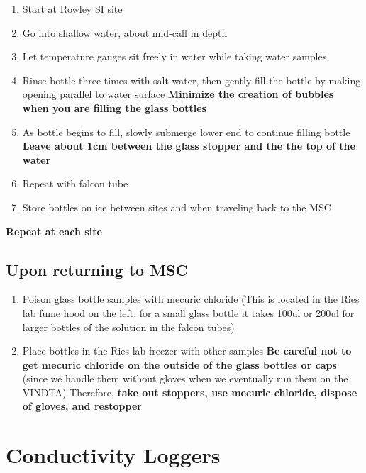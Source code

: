 \documentclass[
  letterpaper,
  DIV=11,
  numbers=noendperiod]{scrreprt}
\begin{document}
\begin{enumerate}
\def\labelenumi{\arabic{enumi}.}
\item
  Start at Rowley SI site
\item
  Go into shallow water, about mid-calf in depth
\item
  Let temperature gauges sit freely in water while taking water samples
\item
  Rinse bottle three times with salt water, then gently fill the bottle
  by making opening parallel to water surface \textbf{Minimize the
  creation of bubbles when you are filling the glass bottles}
\item
  As bottle begins to fill, slowly submerge lower end to continue
  filling bottle \textbf{Leave about 1cm between the glass stopper and
  the the top of the water}
\item
  Repeat with falcon tube
\item
  Store bottles on ice between sites and when traveling back to the MSC
\end{enumerate}

\textbf{Repeat at each site}

\hypertarget{upon-returning-to-msc}{%
\section*{\texorpdfstring{\textbf{Upon returning to
MSC}}{Upon returning to MSC}}\label{upon-returning-to-msc}}

\begin{enumerate}
\def\labelenumi{\arabic{enumi}.}
\item
  Poison glass bottle samples with mecuric chloride (This is located in
  the Ries lab fume hood on the left, for a small glass bottle it takes
  100ul or 200ul for larger bottles of the solution in the falcon tubes)
\item
  Place bottles in the Ries lab freezer with other samples \textbf{Be
  careful not to get mecuric chloride on the outside of the glass
  bottles or caps} (since we handle them without gloves when we
  eventually run them on the VINDTA) Therefore, \textbf{take out
  stoppers, use mecuric chloride, dispose of gloves, and restopper}
\end{enumerate}

\hypertarget{conductivity-loggers}{%
\chapter{Conductivity Loggers}\label{conductivity-loggers}}
\end{document}

